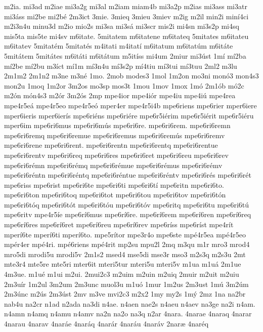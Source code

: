 {m2ia.
mi3ad
m2iae
mi3a2g
mi3al
m2iam
miam4b
mi3a2p
m2ias
mi3ass
mi3atr
mi3^^e1ss
mi2be
mi2b^^e9
2m3ict
3mie.
3mieq
3mieu
3miev
m2ig
m2il
min2i
min^^ed4ci
m2i3n4u
minu3d
m2io
mio2s
mi3sa
mi3s^^e1
mi3scr
mis2i
mi4sn
mi3s2p
mi4sq
mis5ta
mis5te
mi4sv
m6itate.
5mitatem
m6itatene
m6itateq
5mitates
m6itateu
m6itatev
5mitat^^e9m
5mitat^^e9s
m4itati
m4itat^^ed
m6itatum
m6itat^^fam
m6it^^e1te
5mit^^e1tem
5mit^^e1tes
m6it^^e1ti
m6it^^e1tum
m5it^^edss
mi4um
2miur
mi3^^fast
1m^^ed
m^^ed2ba
m^^ed2be
m^^ed2bu
m3^^edct
m^^ed1m
m^^ed3n4u
m^^ed3s2p
m^^ed4tiu
m^^ed3tui
m^^ed3tuu
2ml2
m3lu
2m1m2
2m1n2
m3ne
m3n^^e9
1mo.
2mob
modes3
1mol
1m2on
mo3ni
mon^^f33
mon4s3
mon2u
1moq
1m2or
3m2os
mo3sp
mos3t
1mou
1mov
1mox
1m^^f3
2m1^^f3b
m^^f32c
m2^^f3n
m^^f3n4s3
m2^^f3r
3m2^^f3s
2mp
mpe4ior
mpe4i^^f3r
mpe4iu
mpe4i^^fa
mpe4rea
mpe4r5e^^e1
mpe4r5eo
mpe4r5e^^f3
mper4er
mpe4r5i4b
mpe6riens
mpe6rier
mper6iere
mper6ieris
mper6ier^^eds
mpe6ri^^e9ns
mpe6ri^^e9re
mpe6r5i^^e9rim
mpe6r5i^^e9rit
mpe6r5i^^e9ru
mper6im
mpe6ri6mus
mpe6ri6m^^fas
mpe6ri6re.
mpe6ri6rem.
mpe6ri6remn
mpe6ri6remq
mpe6ri6remue
mpe6ri6remus
mpe6ri6rem^^fas
mpe6ri6remv
mpe6ri6rene
mpe6ri6rent.
mpe6ri6rentn
mpe6ri6rentq
mpe6ri6rentue
mpe6ri6rentv
mpe6ri6req
mpe6ri6res
mpe6ri6ret
mpe6ri6reu
mpe6ri6rev
mpe6ri6r^^e9mn
mpe6ri6r^^e9mq
mpe6ri6r^^e9mue
mpe6ri6r^^e9mus
mpe6ri6r^^e9mv
mpe6ri6r^^e9ntn
mpe6ri6r^^e9ntq
mpe6ri6r^^e9ntue
mpe6ri6r^^e9ntv
mpe6ri6r^^e9s
mpe6ri6r^^e9t
mpe6riss
mpe6rist
mpe6ri6te
mpe6ri6ti
mpe6ri6t^^ed
mpe6ritn
mpe6ri6to.
mpe6ri6ton
mpe6ri6toq
mpe6ri6tot
mpe6ri6tou
mpe6ri6tov
mpe6ri6t^^f3n
mpe6ri6t^^f3q
mpe6ri6t^^f3t
mpe6ri6t^^f3u
mpe6ri6t^^f3v
mpe6ritq
mpe6ri6tu
mpe6ri6t^^fa
mpe6ritv
mpe4r5^^ede
mpe6r^^ed6mus
mpe6r^^ed6re.
mpe6r^^ed6rem
mpe6r^^ed6ren
mpe6r^^ed6req
mpe6r^^ed6res
mpe6r^^ed6ret
mpe6r^^ed6reu
mpe6r^^ed6rev
mpe6r^^edss
mpe6r^^edst
mpe4r^^edt
mper^^ed6te
mper^^ed6ti
mper^^ed6to.
mpe5r^^edtor
mpe3r4o
mpe6ste
mp^^e94r5ea
mp^^e94r5eo
mp^^e9r4er
mp^^e94ri.
mp^^e96riens
mp^^e94rit
mp2su
mpu2l
2mq
m3qu
m1r
mro3
mrod4
mro5di
mrodi5u
mrodi5v
2m1s2
msed4
mse5di
mse3r
mso3
m2s3q
m2s3u
2mt
mte3r4
mte5re
mte5ri
mter6it
mteri5tur
mteri5u
mteri5v
m1ua
m1u^^e1
2m1ue
4m3ue.
m1u^^e9
m1ui
m2ui.
2mui2c3
m2uim
m2uin
m2uiq
2muir
m2uit
m2uiu
2m3u^^edr
1m2ul
3m2um
2m3unc
muol3u
m1u^^f3
1mur
1m2us
2m3ust
1m^^fa
3m2^^fam
2m3^^fanc
m2^^fas
2m3^^fast
2mv
m3ve
mvi2c3
m2x2
1my
my2s
1m^^fd
2mz
1na
na2br
nab4u
na2cr
n1ad
n2ada
na3di
n4ae.
n4aen
nae2s
n4aeu
n4aev
na3ge
na2i
n4am.
n4amn
n4amq
n4amu
n4amv
na2n
na2o
na3q
n2ar
4nara.
4narae
4naraq
4narar
4narau
4narav
4nar^^e1e
4nar^^e1q
4nar^^e1r
4nar^^e1u
4nar^^e1v
2nar^^e6
4nar^^e9q
}
